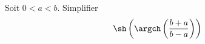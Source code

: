 Soit $0<a<b$. Simplifier
\begin{displaymath}
 \sh\left( \argch\left( \frac{b+a}{b-a}\right) \right) 
\end{displaymath}
\bigskip  \bigskip 